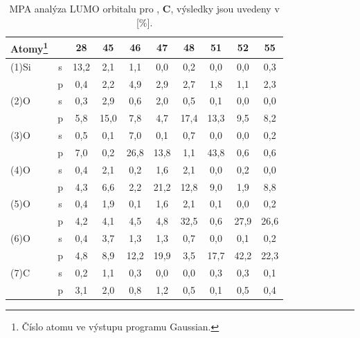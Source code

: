 \documentclass[
digital, %
table,   %
lof,     %
lot,     %
oneside,
]{fithesis3}
\begin{document}
\begin{table}[htbp]
\begin{minipage}{\textwidth}
\caption{MPA analýza LUMO orbitalu pro ,  \textbf{C}, výsledky jsou uvedeny v [\%].}
\begin{center}
\begin{tabular}{|l|c|c|c|c|c|c|c|c|c|}
\hline
\label{si_ch3_och3_5_MPA}Atomy\footnote{Číslo atomu ve výstupu programu Gaussian.}  &  & 28 & 45 & 46 & 47 & 48 & 51 & 52 & 55 \\ \hline
(1)Si & s & 13,2  & 2,1  & 1,1  & 0,0  & 0,2  & 0,0  & 0,0  & 0,3  \\ \hline
& p & 0,4  & 2,2  & 4,9  & 2,9  & 2,7  & 1,8  & 1,1  & 2,3  \\ \hline
(2)O & s & 0,3  & 2,9  & 0,6  & 2,0  & 0,5  & 0,1  & 0,0  & 0,0  \\ \hline
& p & 5,8  & 15,0  & 7,8  & 4,7  & 17,4  & 13,3  & 9,5  & 8,2  \\ \hline
(3)O & s & 0,5  & 0,1  & 7,0  & 0,1  & 0,7  & 0,0  & 0,0  & 0,2  \\ \hline
& p & 7,0  & 0,2  & 26,8  & 13,8  & 1,1  & 43,8  & 0,6  & 0,6  \\ \hline
(4)O & s & 0,4  & 2,1  & 0,2  & 1,6  & 2,1  & 0,0  & 0,2  & 0,0  \\ \hline
& p & 4,3  & 6,6  & 2,2  & 21,2  & 12,8  & 9,0  & 1,9  & 8,8  \\ \hline
(5)O & s & 0,4  & 1,9  & 0,1  & 1,6  & 2,1  & 0,1  & 0,0  & 0,2  \\ \hline
& p & 4,2  & 4,1  & 4,5  & 4,8  & 32,5  & 0,6  & 27,9  & 26,6  \\ \hline
(6)O & s & 0,4  & 3,7  & 1,3  & 1,3  & 0,7  & 0,0  & 0,1  & 0,2  \\ \hline
& p & 4,8  & 8,9  & 12,2  & 19,9  & 3,5  & 17,7  & 42,2  & 22,3  \\ \hline
(7)C & s & 0,2  & 1,1  & 0,3  & 0,0  & 0,0  & 0,3  & 0,3  & 0,1  \\ \hline
& p & 3,1  & 2,0  & 0,8  & 1,2  & 0,5  & 0,1  & 0,5  & 0,4  \\ \hline
\end{tabular}\end{center}\end{minipage}
\end{table}
\end{document}

